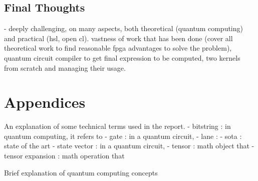 \documentclass[12pt,oneside,a4paper]{article}
\begin{document}
\subsection{Final Thoughts}
- deeply challenging, on many aspects, both theoretical (quantum computing) and practical (hsl, open cl). vastness of work that has been done (cover all theoretical work to find reasonable fpga advantages to solve the problem), quantum circuit compiler to get final expression to be computed, two kernels from scratch and managing their usage.





\printbibliography[title={\section{References}}]




\section{Appendices}
An explanation of some technical terms used in the report.
- bitstring : in quantum computing, it refers to
- gate : in a quantum circuit,
- lane :
- sota : state of the art
- state vector : in a quantum circuit,
- tensor : math object that
- tensor expansion : math operation that

Brief explanation of quantum computing concepts


\end{document}
